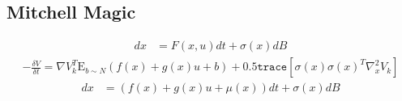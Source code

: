\documentclass[a4paper]{article}
\begin{document}
\subsection{Mitchell Magic}

\begin{align}
dx &= F(x,u) dt + \sigma(x) dB
\end{align}
\begin{align}
-\frac{\delta V}{\delta t} = \nabla V_k^T \mathrm{E}_{b\sim N} ( f(x) + g(x) u + b ) + 0.5 \texttt{trace} [\sigma(x) \sigma(x)^T \nabla^2_x V_k]
\end{align}
\begin{align}
dx &= (f(x) + g(x) u + \mu(x) ) dt + \sigma(x) dB
\end{align}
\end{document}
